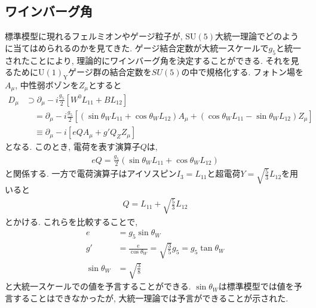 \subsection{ワインバーグ角}
標準模型に現れるフェルミオンやゲージ粒子が, $\mathrm{SU(5)}$大統一理論でどのように当てはめられるのかを見てきた.
ゲージ結合定数が大統一スケールで$g_5$と統一されたことにより, 理論的にワインバーグ角を決定することができる.
それを見るために$\mathrm{U(1)_Y}$ゲージ群の結合定数を$SU(5)$の中で規格化する.
フォトン場を$A_\mu$, 中性弱ボゾンを$Z_\mu$とすると
\begin{align}
  D_\mu &\supset \partial_\mu -i\frac{g_5}{2}[W^0 L_{11} + B L_{12}]\nonumber\\
        &\quad=\partial_\mu -i\frac{g_5}{2}[(\sin\theta_W L_{11} + \cos\theta_W L_{12})A_\mu + (\cos\theta_W L_{11} -\sin\theta_W L_{12})Z_\mu]\nonumber\\
        &\quad\equiv \partial_\mu -i[eQA_\mu + g' Q_Z Z_\mu]\nonumber
\end{align}
となる.
このとき, 電荷を表す演算子$Q$は,
\begin{align}
  eQ = \frac{g_5}{2}(\sin\theta_W L_{11} + \cos\theta_W L_{12})\nonumber
\end{align}
と関係する.
一方で電荷演算子はアイソスピン$I_3 = L_{11}$と超電荷$Y=\sqrt{\frac{5}{3}}L_{12}$を用いると
\begin{align}
  Q = L_{11} + \sqrt{\frac{5}{3}}L_{12}\nonumber
\end{align}
とかける.
これらを比較することで,
\begin{align}
  e &= g_5\sin\theta_W\nonumber\\
  g'&= \frac{e}{\cos\theta_W}=\sqrt{\frac{3}{5}}g_5 = g_5 \tan\theta_W\nonumber\\
  \sin\theta_W &=\sqrt{\frac{3}{8}}\nonumber
\end{align}
と大統一スケールでの値を予言することができる.
$\sin\theta_W$は標準模型では値を予言することはできなかったが, 大統一理論では予言ができることが示された.


